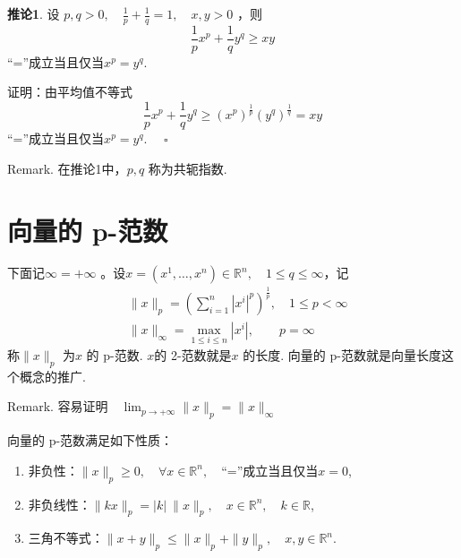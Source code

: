 \documentclass{article}
\begin{document}
\noindent \textbf{推论1}. 设 \(p, q > 0,\quad \frac{1}{p} + \frac{1}{q} = 1,\quad x, y > 0\) ，则
\begin{equation*}
    \frac{1}{p} x^p + \frac{1}{q} y^q \ge xy
\end{equation*}
“=”成立当且仅当\(x^p = y^q\).

\vspace{20pt}

\noindent 证明：由平均值不等式
\begin{equation*}
    \frac{1}{p} x^p + \frac{1}{q} y^q \ge (x^p)^\frac{1}{p} (y^q)^\frac{1}{q} = xy
\end{equation*}
“=”成立当且仅当\(x^p = y^q\). \(\quad \square\)

\vspace{20pt}
\noindent Remark. 在推论1中，\(p, q\) 称为共轭指数.

\newpage

\section{向量的 p-范数}

下面记\(\infty =+ \infty \) 。设\(x =(x^1,\dots ,x^n) \in \mathbb{R}^n,\quad 1 \le q \le \infty \)，记
\begin{align*}
    & \| x\|_p =\left(\sum_{i=1}^n |x^i|^p\right)^\frac{1}{p},\quad 1 \le p < \infty \\
    & \| x\|_{\infty} = \max _{1 \le i \le n }| x^i |,\qquad p = \infty
\end{align*}
称\(\|x\|_p\) 为\(x\) 的 p-范数. \(x\)的 2-范数就是\(x\) 的长度. 向量的 p-范数就是向量长度这个概念的推广.

\vspace{20pt}

\noindent Remark. 容易证明\(\quad \lim_{p \to + \infty }\|x\|_p =\|x\|_{\infty } \)

\vspace{20pt}

向量的 p-范数满足如下性质：
\begin{enumerate}
    \item 非负性：\(\|x\|_p \ge 0,\quad \forall x \in \mathbb{R}^n,\quad \)“=”成立当且仅当\(x = 0\),
    \item 非负线性：\(\|kx\|_p = | k |\ \|x\|_p,\quad x \in \mathbb{R}^n,\quad k \in \mathbb{R}\),
    \item 三角不等式：\(\|x + y\|_p \le \|x\|_p +\|y\|_p,\quad x, y \in \mathbb{R}^n\).
\end{enumerate}
\end{document}
